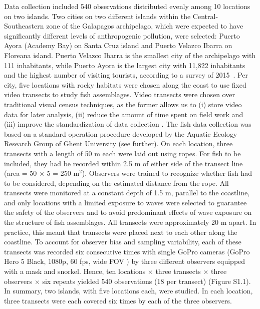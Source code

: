 \documentclass[jmse,article,accept,moreauthors,pdftex]{Definitions/mdpi}
\begin{document}
Data collection included 540 observations distributed evenly among 10 locations on two islands. Two cities on two different islands within the Central-Southeastern zone of the Galapagos archipelago, which were expected to have significantly different levels of anthropogenic pollution, were selected: Puerto Ayora (Academy Bay) on Santa Cruz island and Puerto Velazco Ibarra on Floreana island. Puerto Velazco Ibarra is the smallest city of the archipelago with 111 inhabitants, while Puerto Ayora is the largest city with 11,822 inhabitants and the highest number of visiting tourists, according to a survey of \mbox{2015 \citep{INEC2015Censo2015}.} Per city, five locations with rocky habitats were chosen along the coast to use fixed video transects to study fish assemblages. Video transects were chosen over traditional visual census techniques, as the former allows us to (i) store video data for later analysis, (ii) reduce the amount of time spent on field work and (iii) improve the standardization of data collection \citep{Mallet2014,Wartenberg2015}. The fish data collection was based on a standard operation procedure developed by the Aquatic Ecology Research Group of Ghent University (see further). On each location, three transects with a length of 50 m each were laid out using ropes. For fish to be included, they had be recorded within 2.5 m of either side of the transect line (area = 50 $\times$ 5 = 250 m$^{2}$). Observers were trained to recognize whether fish had to be considered, depending on the estimated distance from the rope. All transects were monitored at a constant depth of 1.5 m, parallel to the coastline, and only locations with a limited exposure to waves were selected to guarantee the safety of the observers and to avoid predominant effects of wave exposure on the structure of fish assemblages. All transects were approximately 20 m apart. In practice, this meant that transects were placed next to each other along the coastline. To account for observer bias and sampling variability, each of these transects was recorded six consecutive times with single GoPro cameras (GoPro Hero 5 Black, 1080p, 60 fps, wide FOV%
) by three different observers equipped with a mask and snorkel. Hence, ten locations {×} %
 three transects {×} three observers {×} six repeats yielded 540 observations (18 per transect) (Figure S1.1). In summary, two islands, with five locations each, were studied. In each location, three transects were each covered six times by each of the three observers.
\end{document}
